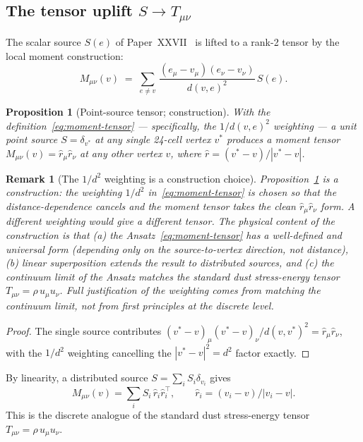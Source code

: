 \documentclass[12pt]{article}
\newtheorem{proposition}[theorem]{Proposition}
\newtheorem{remark}[theorem]{Remark}
\begin{document}
\subsection{The tensor uplift $S \to T_{\mu\nu}$}\label{sec:gr:tensor}

The scalar source $S(e)$ of Paper~XXVII~\citep{SmartXXVII} is lifted to a rank-2 tensor by the local moment construction:
\begin{equation}\label{eq:moment-tensor}
M_{\mu\nu}(v) \;=\; \sum_{e \neq v}\, \frac{(e_\mu - v_\mu)(e_\nu - v_\nu)}{d(v, e)^2}\, S(e).
\end{equation}

\begin{proposition}[Point-source tensor; construction]\label{prop:point-source}
With the definition~\eqref{eq:moment-tensor} --- specifically, the $1/d(v, e)^2$ weighting --- a unit point source $S = \delta_{v^*}$ at any single 24-cell vertex $v^*$ produces a moment tensor $M_{\mu\nu}(v) = \hat{r}_\mu \hat{r}_\nu$ at any other vertex $v$, where $\hat{r} = (v^* - v) / |v^* - v|$.
\end{proposition}

\begin{remark}[The $1/d^2$ weighting is a construction choice]\label{rmk:moment-choice}
Proposition~\ref{prop:point-source} is a \emph{construction}: the weighting $1/d^2$ in~\eqref{eq:moment-tensor} is chosen \emph{so that} the distance-dependence cancels and the moment tensor takes the clean $\hat{r}_\mu \hat{r}_\nu$ form. A different weighting would give a different tensor. The physical content of the construction is that (a) the Ansatz~\eqref{eq:moment-tensor} has a well-defined and universal form (depending only on the source-to-vertex direction, not distance), (b) linear superposition extends the result to distributed sources, and (c) the continuum limit of the Ansatz matches the standard dust stress-energy tensor $T_{\mu\nu} = \rho\, u_\mu u_\nu$. Full justification of the weighting comes from matching the continuum limit, not from first principles at the discrete level.
\end{remark}

\begin{proof}
The single source contributes $(v^* - v)_\mu (v^* - v)_\nu / d(v, v^*)^2 = \hat{r}_\mu \hat{r}_\nu$, with the $1/d^2$ weighting cancelling the $|v^* - v|^2 = d^2$ factor exactly.
\end{proof}

By linearity, a distributed source $S = \sum_i S_i \delta_{v_i}$ gives
\[
M_{\mu\nu}(v) = \sum_i S_i\, \hat{r}_i \hat{r}_i^\top, \qquad \hat{r}_i = (v_i - v)/|v_i - v|.
\]
This is the discrete analogue of the standard dust stress-energy tensor $T_{\mu\nu} = \rho\, u_\mu u_\nu$.
\end{document}

